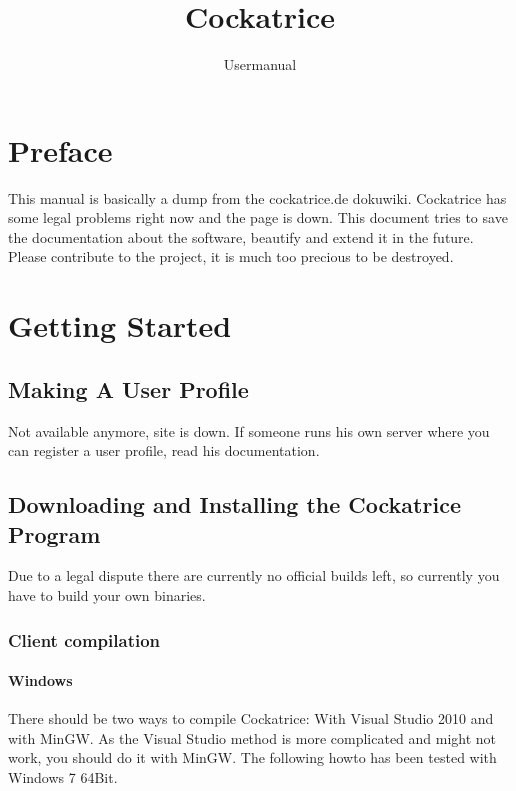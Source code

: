 \documentclass[a4paper]{scrbook}
\title{Cockatrice}
\subtitle{Usermanual}
\begin{document}
\maketitle
\tableofcontents

\chapter{Preface}
This manual is basically a dump from the cockatrice.de dokuwiki. Cockatrice has some legal problems right now and the page is down.
This document tries to save the documentation about the software, beautify and extend it in the future.
Please contribute to the project, it is much too precious to be destroyed.

\chapter{Getting Started}
\section{Making A User Profile}
Not available anymore, site is down. 
If someone runs his own server where you can register a user profile, read his documentation.

\section{Downloading and Installing the Cockatrice Program}
Due to a legal dispute there are currently no official builds left, so currently you have to build your own binaries.

\subsection{Client compilation}
\subsubsection{Windows}
There should be two ways to compile Cockatrice: With Visual Studio 2010 and with MinGW.
As the Visual Studio method is more complicated and might not work, you should do it with MinGW.
The following howto has been tested with Windows 7 64Bit.
\end{document}
